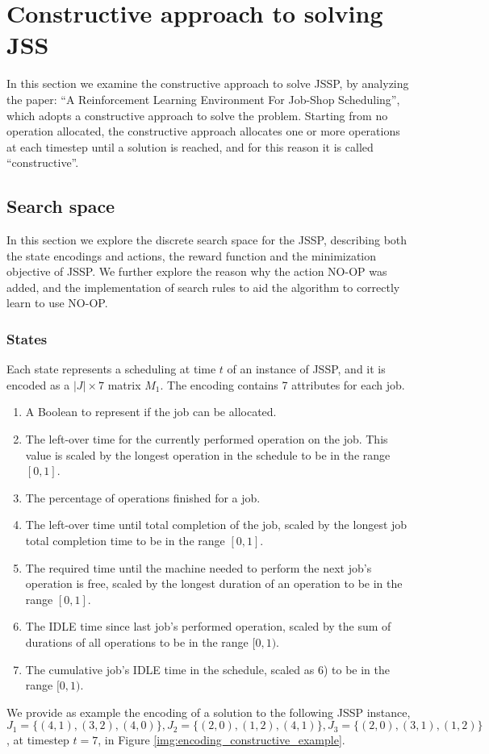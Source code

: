 \documentclass[12pt]{article}
\begin{document}
\medbreak
\section{Constructive approach to solving JSS}
\label{section:constructive}
In this section we examine the constructive approach to solve JSSP, by analyzing the paper: ``A Reinforcement Learning Environment For Job-Shop Scheduling''\cite{pierre_constructive_approach}, 
which adopts a constructive approach to solve the problem. Starting from no operation allocated, the constructive approach allocates one or more operations at each timestep until a solution is reached, and for this reason 
it is called ``constructive''.

\medbreak
\subsection{Search space}
\label{subsection:search_space_constructive}
In this section we explore the discrete search space for the JSSP, describing both the state encodings and actions, the reward function and
 the minimization objective of JSSP.
 We further explore the reason why the action NO-OP was added, and the implementation of search rules to aid the algorithm to correctly learn to use NO-OP.

\medbreak
\subsubsection{States}
Each state represents a scheduling at time $t$ of an instance of JSSP, and it is encoded as a $|J|\times7$ matrix $M_1$.
The encoding contains 7 attributes for each job\cite{pierre_constructive_approach}.
\begin{enumerate}
    \item A Boolean to represent if the job can be allocated.
    \item The left-over time for the currently performed operation on the job. This value is scaled by the longest operation in the schedule to be in the range $[0, 1]$.
    \item The percentage of operations finished for a job.
    \item The left-over time until total completion of the job, scaled by the longest job total completion time to be in the range $[0, 1]$.
    \item The required time until the machine needed to perform the next job’s operation is free, scaled by the longest duration of an operation to be in the range $[0, 1]$.
    \item The IDLE time since last job’s performed operation, scaled by the sum of durations of all operations to be in the range $[0, 1)$.
    \item The cumulative job’s IDLE time in the schedule, scaled as 6) to be in the range $[0, 1)$.
\end{enumerate}
We provide as example the encoding of a solution to the following JSSP instance, $J_1 = \{(4,1),(3,2),(4,0)\}, J_2 = \{(2,0),(1,2),(4,1)\}, J_3 = \{(2,0),(3,1),(1,2)\}$, at timestep $t=7$, in Figure \ref{img:encoding_constructive_example}.
\end{document}
